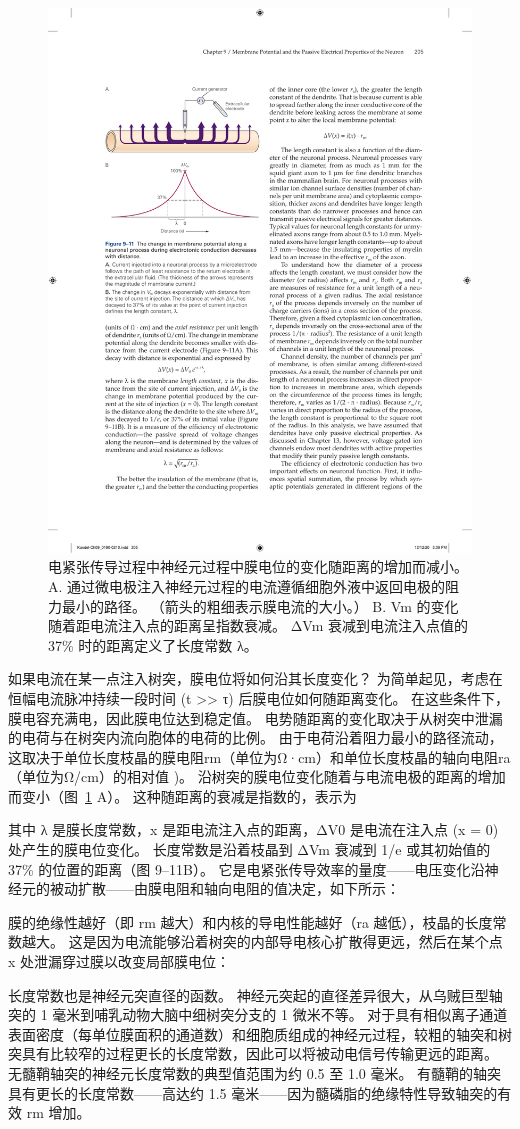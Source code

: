 \begin{figure}[htbp]
	\centering
	\includegraphics[width=0.5\linewidth]{chap09/fig_9_11}
	\caption{电紧张传导过程中神经元过程中膜电位的变化随距离的增加而减小。 A. 通过微电极注入神经元过程的电流遵循细胞外液中返回电极的阻力最小的路径。 （箭头的粗细表示膜电流的大小。） B. Vm 的变化随着距电流注入点的距离呈指数衰减。 ΔVm 衰减到电流注入点值的 37\% 时的距离定义了长度常数 λ。}
	\label{fig:9_11}
\end{figure}


如果电流在某一点注入树突，膜电位将如何沿其长度变化？
为简单起见，考虑在恒幅电流脉冲持续一段时间 (t >> τ) 后膜电位如何随距离变化。
在这些条件下，膜电容充满电，因此膜电位达到稳定值。 电势随距离的变化取决于从树突中泄漏的电荷与在树突内流向胞体的电荷的比例。
由于电荷沿着阻力最小的路径流动，这取决于单位长度枝晶的膜电阻rm（单位为Ω·cm）和单位长度枝晶的轴向电阻ra（单位为Ω/cm）的相对值 )。
沿树突的膜电位变化随着与电流电极的距离的增加而变小（图~\ref{fig:9_11} A）。
这种随距离的衰减是指数的，表示为


其中 λ 是膜长度常数，x 是距电流注入点的距离，ΔV0 是电流在注入点 (x = 0) 处产生的膜电位变化。 
长度常数是沿着枝晶到 ΔVm 衰减到 1/e 或其初始值的 37\% 的位置的距离（图 9–11B）。
它是电紧张传导效率的量度——电压变化沿神经元的被动扩散——由膜电阻和轴向电阻的值决定，如下所示：


膜的绝缘性越好（即 rm 越大）和内核的导电性能越好（ra 越低），枝晶的长度常数越大。
这是因为电流能够沿着树突的内部导电核心扩散得更远，然后在某个点 x 处泄漏穿过膜以改变局部膜电位：


长度常数也是神经元突直径的函数。
神经元突起的直径差异很大，从乌贼巨型轴突的 1 毫米到哺乳动物大脑中细树突分支的 1 微米不等。
对于具有相似离子通道表面密度（每单位膜面积的通道数）和细胞质组成的神经元过程，较粗的轴突和树突具有比较窄的过程更长的长度常数，因此可以将被动电信号传输更远的距离。
无髓鞘轴突的神经元长度常数的典型值范围为约 0.5 至 1.0 毫米。
有髓鞘的轴突具有更长的长度常数——高达约 1.5 毫米——因为髓磷脂的绝缘特性导致轴突的有效 rm 增加。


